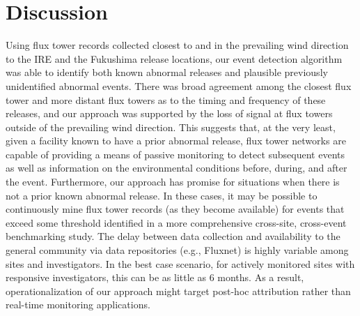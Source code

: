 \documentclass{article}
\begin{document}
\section{Discussion}
Using flux tower records collected closest to and in the prevailing wind direction to the IRE and the Fukushima release locations, our event detection algorithm was able to identify both known abnormal releases and plausible previously unidentified abnormal events. There was broad agreement among the closest flux tower and more distant flux towers as to the timing and frequency of these releases, and our approach was supported by the loss of signal at flux towers outside of the prevailing wind direction. This suggests that, at the very least, given a facility known to have a prior abnormal release, flux tower networks are capable of providing a means of passive monitoring to detect subsequent events as well as information on the environmental conditions before, during, and after the event. Furthermore, our approach has promise for situations when there is not a prior known abnormal release. In these cases, it may be possible to continuously mine flux tower records (as they become available) for events that exceed some threshold identified in a more comprehensive cross-site, cross-event benchmarking study. The delay between data collection and availability to the general community via data repositories (e.g., Fluxnet) is highly variable among sites and investigators. In the best case scenario, for actively monitored sites with responsive investigators, this can be as little as 6 months. As a result, operationalization of our approach might target post-hoc attribution rather than real-time monitoring applications.
\end{document}
